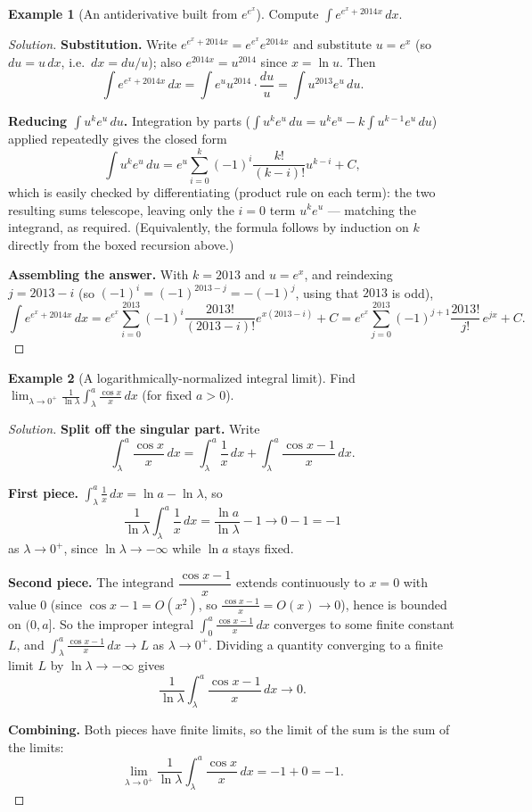\documentclass[11pt]{article}
\theoremstyle{definition}
\newtheorem{example}{Example}[section]
\begin{document}
\begin{example}[An antiderivative built from $e^{e^x}$]
Compute $\displaystyle\int e^{e^x+2014x}\,dx$.
\end{example}
\begin{proof}[Solution]
\textbf{Substitution.} Write $e^{e^x+2014x}=e^{e^x}e^{2014x}$ and substitute $u=e^x$ (so $du=u\,dx$, i.e.\ $dx=du/u$); also $e^{2014x}=u^{2014}$ since $x=\ln u$. Then
\[
\int e^{e^x+2014x}\,dx=\int e^{u}u^{2014}\cdot\frac{du}{u}=\int u^{2013}e^{u}\,du.
\]

\textbf{Reducing $\int u^ke^u\,du$.} Integration by parts ($\int u^ke^u\,du=u^ke^u-k\int u^{k-1}e^u\,du$) applied repeatedly gives the closed form
\[
\int u^ke^u\,du=e^u\sum_{i=0}^{k}(-1)^i\frac{k!}{(k-i)!}u^{k-i}+C,
\]
which is easily checked by differentiating (product rule on each term): the two resulting sums telescope, leaving only the $i=0$ term $u^ke^u$ — matching the integrand, as required. (Equivalently, the formula follows by induction on $k$ directly from the boxed recursion above.)

\textbf{Assembling the answer.} With $k=2013$ and $u=e^x$, and reindexing $j=2013-i$ (so $(-1)^i=(-1)^{2013-j}=-(-1)^j$, using that $2013$ is odd),
\[
\int e^{e^x+2014x}\,dx=e^{e^x}\sum_{i=0}^{2013}(-1)^i\frac{2013!}{(2013-i)!}e^{x(2013-i)}+C
=\boxed{e^{e^x}\sum_{j=0}^{2013}(-1)^{j+1}\frac{2013!}{j!}\,e^{jx}+C}.
\]
\end{proof}

\begin{example}[A logarithmically-normalized integral limit]
Find $\displaystyle\lim_{\lambda\to0^+}\frac{1}{\ln\lambda}\int_\lambda^a\frac{\cos x}{x}\,dx$ (for fixed $a>0$).
\end{example}
\begin{proof}[Solution]
\textbf{Split off the singular part.} Write
\[
\int_\lambda^a\frac{\cos x}x\,dx=\int_\lambda^a\frac1x\,dx+\int_\lambda^a\frac{\cos x-1}{x}\,dx.
\]

\textbf{First piece.} $\displaystyle\int_\lambda^a\frac1x\,dx=\ln a-\ln\lambda$, so
\[
\frac{1}{\ln\lambda}\int_\lambda^a\frac1x\,dx=\frac{\ln a}{\ln\lambda}-1\longrightarrow0-1=-1
\]
as $\lambda\to0^+$, since $\ln\lambda\to-\infty$ while $\ln a$ stays fixed.

\textbf{Second piece.} The integrand $\dfrac{\cos x-1}{x}$ extends continuously to $x=0$ with value $0$ (since $\cos x-1=O(x^2)$, so $\frac{\cos x-1}{x}=O(x)\to0$), hence is bounded on $(0,a]$. So the improper integral $\int_0^a\frac{\cos x-1}{x}\,dx$ converges to some finite constant $L$, and $\int_\lambda^a\frac{\cos x-1}{x}\,dx\to L$ as $\lambda\to0^+$. Dividing a quantity converging to a finite limit $L$ by $\ln\lambda\to-\infty$ gives
\[
\frac{1}{\ln\lambda}\int_\lambda^a\frac{\cos x-1}{x}\,dx\longrightarrow0.
\]

\textbf{Combining.} Both pieces have finite limits, so the limit of the sum is the sum of the limits:
\[
\boxed{\lim_{\lambda\to0^+}\frac{1}{\ln\lambda}\int_\lambda^a\frac{\cos x}{x}\,dx=-1+0=-1}.
\]
\end{proof}
\end{document}
